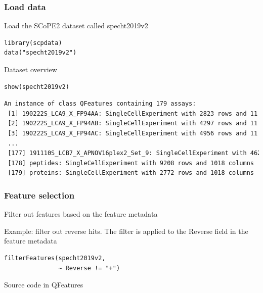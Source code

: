 \documentclass{beamer}
\newcommand{\hcode}[2][lgray]{{\ttfamily\color{vdgray}\colorbox{#1}{#2}}}
\newcommand{\frametitlesection}[1]{\frametitle{\centering #1 \footnotesize \hspace{0pt plus 1 filll} \insertsection}}
\begin{document}
\begin{frame}[fragile]
    \frametitlesection{Load data}
    
    Load the SCoPE2 dataset called \hcode{specht2019v2}
    
    \begin{lstlisting}
library(scpdata)
data("specht2019v2")
    \end{lstlisting}
    
    Dataset overview
    
    \begin{lstlisting}
show(specht2019v2)
    \end{lstlisting}
    
    \begin{lstlisting}[language = TeX, numbers = none, basicstyle = \tiny\ttfamily\color{vdgray}]
An instance of class QFeatures containing 179 assays:
 [1] 190222S_LCA9_X_FP94AA: SingleCellExperiment with 2823 rows and 11 col...
 [2] 190222S_LCA9_X_FP94AB: SingleCellExperiment with 4297 rows and 11 col...
 [3] 190222S_LCA9_X_FP94AC: SingleCellExperiment with 4956 rows and 11 col...
 ...
 [177] 191110S_LCB7_X_APNOV16plex2_Set_9: SingleCellExperiment with 4626 r...
 [178] peptides: SingleCellExperiment with 9208 rows and 1018 columns
 [179] proteins: SingleCellExperiment with 2772 rows and 1018 columns
    \end{lstlisting}
\end{frame}


\begin{frame}[fragile]
    \frametitlesection{Feature selection}
    
    Filter out features based on the feature metadata
    
    \bigskip
    
    Example: filter out reverse hits. The filter is applied to the 
    \hcode{Reverse} field in the feature metadata

    \begin{lstlisting}
filterFeatures(specht2019v2, 
               ~ Reverse != "+")
    \end{lstlisting}
    
    Source code in \hcode{QFeatures}
\end{frame}
\end{document}
